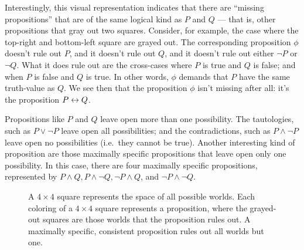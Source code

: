 Interestingly, this visual representation indicates that there are
``missing propositions'' that are of the same logical kind as $P$ and
$Q$ --- that is, other propositions that gray out two squares.
Consider, for example, the case where the top-right and bottom-left
square are grayed out.  The corresponding proposition $\phi$ doesn't
rule out $P$, and it doesn't rule out $Q$, and it doesn't rule out
either $\neg P$ or $\neg Q$.  What it does rule out are the
cross-cases where $P$ is true and $Q$ is false; and when $P$ is false
and $Q$ is true.  In other words, $\phi$ demands that $P$ have the
same truth-value as $Q$.  We see then that the proposition $\phi$
isn't missing after all: it's the proposition $P\leftrightarrow Q$.

Propositions like $P$ and $Q$ leave open more than one possibility.
The tautologies, such as $P\vee\neg P$ leave open all possibilities;
and the contradictions, such as $P\wedge\neg P$ leave open no
possibilities (i.e.\ they cannot be true).  Another interesting kind
of proposition are those maximally specific propositions that leave
open only one possibility.  In this case, there are four maximally
specific propositions, represented by
$P\wedge Q,P\wedge\neg Q,\neg P\wedge Q$, and $\neg P\wedge\neg Q$.
\begin{figure}[h]
\caption{A $4\times 4$ square represents the space of all possible
  worlds.  Each coloring of a $4\times 4$ square represents a
  proposition, where the grayed-out squares are those worlds that the proposition rules
  out.  A maximally specific, consistent proposition rules out all
  worlds but one.} \end{figure}

